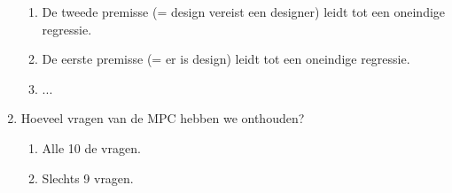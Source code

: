 \documentclass[kulak]{kulakarticle}
\begin{document}
\begin{enumerate}
\begin{enumerate}
			\item De tweede premisse (= design vereist een designer) leidt tot een oneindige regressie.
			\item De eerste premisse (= er is design) leidt tot een oneindige regressie.
			\item ...
		\end{enumerate}
		\item Hoeveel vragen van de MPC hebben we onthouden?
		\begin{enumerate}
			\item Alle 10 de vragen.
			\item Slechts 9 vragen.
		\end{enumerate}
	\end{enumerate}
\end{document}
